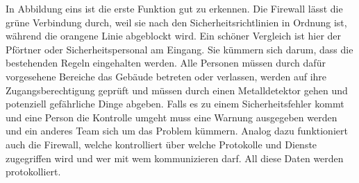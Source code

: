 In Abbildung eins ist die erste Funktion gut zu erkennen. Die Firewall lässt die grüne Verbindung durch, weil sie nach den Sicherheitsrichtlinien in Ordnung ist, während die orangene Linie abgeblockt wird. Ein schöner Vergleich ist hier der Pförtner oder Sicherheitspersonal am Eingang. Sie kümmern sich darum, dass die bestehenden Regeln eingehalten werden. Alle Personen müssen durch dafür vorgesehene Bereiche das Gebäude betreten oder verlassen, werden auf ihre Zugangsberechtigung geprüft und müssen durch einen Metalldetektor gehen und potenziell gefährliche Dinge abgeben. Falls es zu einem Sicherheitsfehler kommt und eine Person die Kontrolle umgeht muss eine Warnung ausgegeben werden und ein anderes Team sich um das Problem kümmern. Analog dazu funktioniert auch die Firewall, welche kontrolliert über welche Protokolle und Dienste zugegriffen wird und wer mit wem kommunizieren darf. All diese Daten werden protokolliert. \footnotemark
{}



